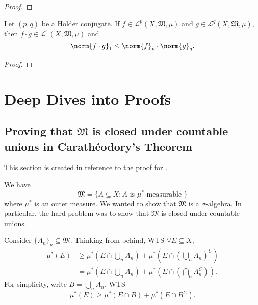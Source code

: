 \documentclass[notoc,notitlepage]{tufte-book}
\begin{document}
\begin{proof}
\end{proof}

\begin{thm}\label{thm:holder_s_inequality}
  Let $(p, q)$ be a Hölder conjugate.
  If $f \in \mathcal{L}^p(X, \mathfrak{M}, \mu)$
  and $g \in \mathcal{L}^q(X, \mathfrak{M}, \mu)$, then
  $f \cdot g \in \mathcal{L}^1(X, \mathfrak{M}, \mu)$ and
  \begin{equation*}
    \norm{f \cdot g}_1 \leq \norm{f}_p \cdot \norm{g}_q.
  \end{equation*}
\end{thm}

\begin{proof}
\end{proof}



\appendix

\chapter{Deep Dives into Proofs}%
\label{chp:deep_dives_into_proofs}

\section{Proving that \texorpdfstring{$\mathfrak{M}$}{M} is closed under countable unions in Carath\'{e}odory's Theorem}\label{sec:proving_that_m_is_closed_under_countable_unions_in_caratheodory_s_theorem}

This section is created in reference to
the proof for .

We have
\begin{equation*}
  \mathfrak{M} = \{ A \subseteq X : A \text{ is } \mu^*\text{-measurable } \}
\end{equation*}
where $\mu^*$ is an outer measure.
We wanted to show that $\mathfrak{M}$ is a $\sigma$-algebra.
In particular, the hard problem was to show that
$\mathfrak{M}$ is closed under countable unions.

Consider $\{ A_n \}_{n} \subseteq \mathfrak{M}$.
Thinking from behind, WTS $\forall E \subseteq X$,
\begin{align*}
  \mu^*(E)
  &\geq \mu^* \left( E \cap \bigcup_{n} A_n \right)
    + \mu^* \left( E \cap \left( \bigcup_{n} A_n \right)^C \right) \\
  &= \mu^* \left( E \cap \bigcup_{n} A_n \right)
    + \mu^* \left( E \cap \left( \bigcap_{n} A_n^C \right) \right).
\end{align*}
For simplicity, write $B = \bigcup_{n} A_n$.
WTS
\begin{equation}\tag{$*$}\label{eq:appendix_1_eq_1}
  \mu^*(E) \geq \mu^*(E \cap B) + \mu^*(E \cap B^C).
\end{equation}
\end{document}
